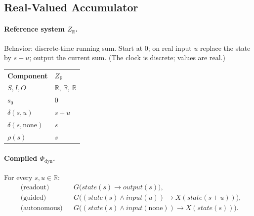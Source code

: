 \subsection{Real-Valued Accumulator}
\label{sec:case-real}

\paragraph{Reference system $Z_{\mathbb{R}}$.}
Behavior: discrete-time running sum. Start at $0$; on real input $u$ replace the state by $s+u$; output the current sum. (The clock is discrete; values are real.)

\begingroup
\renewcommand{\arraystretch}{1.25}
\footnotesize
\begin{center}
\begin{tabularx}{0.78\linewidth}{@{}>{\raggedright\arraybackslash}p{2.8cm}Y@{}}
    \headingfont\bfseries Component & \headingfont\bfseries $Z_{\mathbb{R}}$ \\
    \addlinespace[2pt]
    $S,I,O$ & $\mathbb{R}$, $\mathbb{R}$, $\mathbb{R}$ \\
    \addlinespace[2pt]
    $s_0$ & $0$ \\
    \addlinespace[2pt]
    $\delta(s,u)$ & $s+u$ \\
    \addlinespace[2pt]
    $\delta(s,\mathrm{none})$ & $s$ \\
    \addlinespace[2pt]
    $\rho(s)$ & $s$ \\
\end{tabularx}
\end{center}
\label{tab:z-real}
\endgroup
\vspace{4pt}

\paragraph{Compiled $\Phi_{\mathrm{dyn}}$.}
For every $s,u\in\mathbb{R}$:
\begin{align*}
  &\text{(readout)} && G\bigl(\mathit{state}(s) \rightarrow \mathit{output}(s)\bigr), \\
  &\text{(guided)} && G\bigl((\mathit{state}(s)\wedge\mathit{input}(u)) \rightarrow X(\mathit{state}(s{+}u))\bigr), \\
  &\text{(autonomous)} && G\bigl((\mathit{state}(s)\wedge\mathit{input}(\mathrm{none})) \rightarrow X(\mathit{state}(s))\bigr).
\end{align*}

